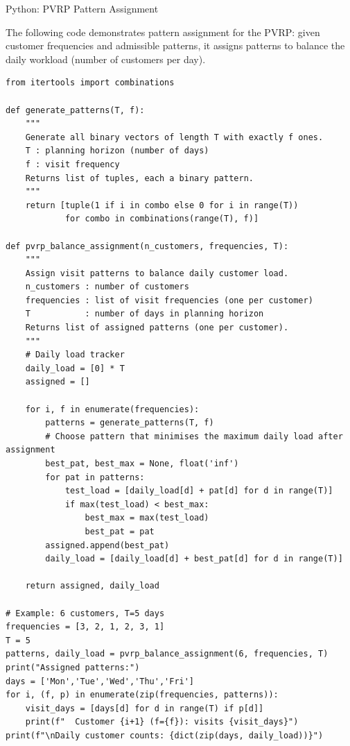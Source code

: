\documentclass[aspectratio=169,10pt]{beamer}
\begin{document}
\begin{frame}[fragile]{Python: PVRP Pattern Assignment}

The following code demonstrates pattern assignment for the PVRP: given
customer frequencies and admissible patterns, it assigns patterns to balance
the daily workload (number of customers per day).

\begin{lstlisting}
from itertools import combinations

def generate_patterns(T, f):
    """
    Generate all binary vectors of length T with exactly f ones.
    T : planning horizon (number of days)
    f : visit frequency
    Returns list of tuples, each a binary pattern.
    """
    return [tuple(1 if i in combo else 0 for i in range(T))
            for combo in combinations(range(T), f)]

def pvrp_balance_assignment(n_customers, frequencies, T):
    """
    Assign visit patterns to balance daily customer load.
    n_customers : number of customers
    frequencies : list of visit frequencies (one per customer)
    T           : number of days in planning horizon
    Returns list of assigned patterns (one per customer).
    """
    # Daily load tracker
    daily_load = [0] * T
    assigned = []

    for i, f in enumerate(frequencies):
        patterns = generate_patterns(T, f)
        # Choose pattern that minimises the maximum daily load after assignment
        best_pat, best_max = None, float('inf')
        for pat in patterns:
            test_load = [daily_load[d] + pat[d] for d in range(T)]
            if max(test_load) < best_max:
                best_max = max(test_load)
                best_pat = pat
        assigned.append(best_pat)
        daily_load = [daily_load[d] + best_pat[d] for d in range(T)]

    return assigned, daily_load

# Example: 6 customers, T=5 days
frequencies = [3, 2, 1, 2, 3, 1]
T = 5
patterns, daily_load = pvrp_balance_assignment(6, frequencies, T)
print("Assigned patterns:")
days = ['Mon','Tue','Wed','Thu','Fri']
for i, (f, p) in enumerate(zip(frequencies, patterns)):
    visit_days = [days[d] for d in range(T) if p[d]]
    print(f"  Customer {i+1} (f={f}): visits {visit_days}")
print(f"\nDaily customer counts: {dict(zip(days, daily_load))}")
\end{lstlisting}

\end{frame}
\end{document}
